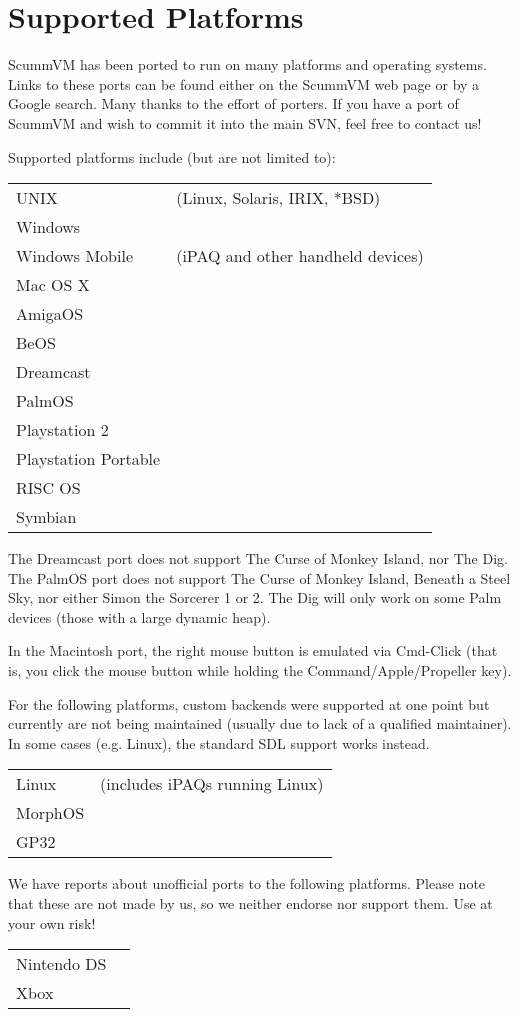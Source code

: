 


\section{Supported Platforms}

ScummVM has been ported to run on many platforms and operating systems.
Links to these ports can be found either on the ScummVM web page or by a
Google search. Many thanks to the effort of porters. If you have a port of
ScummVM and wish to commit it into the main SVN, feel free to contact us!

Supported platforms include (but are not limited to):

\begin{tabular}{ll}
UNIX            &(Linux, Solaris, IRIX, *BSD)\\
Windows         \\
Windows Mobile  &(iPAQ and other handheld devices)\\
Mac OS X        \\
AmigaOS         \\
BeOS            \\
Dreamcast       \\
PalmOS          \\
Playstation 2   \\
Playstation Portable\\
RISC OS         \\
Symbian         \\
\end{tabular}

The Dreamcast port does not support The Curse of Monkey Island, nor The Dig.
The PalmOS port does not support The Curse of Monkey Island, Beneath a Steel
Sky, nor either Simon the Sorcerer 1 or 2. The Dig will only work on some
Palm devices (those with a large dynamic heap).

In the Macintosh port, the right mouse button is emulated via Cmd-Click (that
is, you click the mouse button while holding the Command/Apple/Propeller key).

For the following platforms, custom backends were supported at one point
but currently are not being maintained (usually due to lack of a qualified
maintainer). In some cases (e.g. Linux), the standard SDL support works
instead.

\begin{tabular}{ll}
Linux           &(includes iPAQs running Linux)\\
MorphOS\\
GP32   \\
\end{tabular}

We have reports about unofficial ports to the following platforms. Please
note that these are not made by us, so we neither endorse nor support them.
Use at your own risk!

\begin{tabular}{ll}
Nintendo DS\\
Xbox       \\
\end{tabular}
